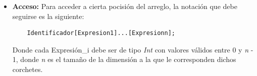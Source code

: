 \documentclass[11pt, spanish]{report}
\begin{document}
\begin{itemize}
  Donde la lista exterior contiene tantos elementos, a su vez listas, como indique la Constante entera1, as\'i, cada una de estas listas ser\'a de tama\~no igual a la Constante entera2, y as\'i sucesivamente. Además x,y,p,q,z y w son expresiones.
\item \textbf{Acceso:}
  Para acceder a cierta pocisi\'on del arreglo, la notaci\'on que debe seguirse es la siguiente:
  \begin{verbatim}
    Identificador[Expresion1]...[Expresionn];
  \end{verbatim}

  Donde cada Expresi\'on\_i debe ser de tipo \emph{Int} con valores v\'alidos entre 0 y \emph{n} - 1, donde \emph{n} es el tama\~no de la dimensi\'on a la que le corresponden dichos corchetes.
\end{itemize}
\end{document}
